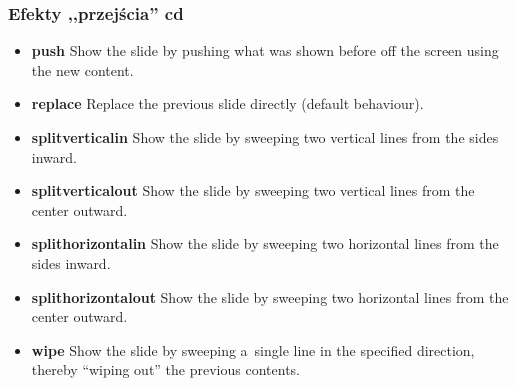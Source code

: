 \documentclass[12pt,aspectratio=169,ignorenonframetext]{beamer}
\begin{document}
\begin{frame}
 \frametitle<presentation>{Efekty ,,przejścia'' cd}
 \begin{itemize}
  \item<1>
        \textbf{push}
        Show the slide by pushing what was shown before off the screen using the new content.
  \item<2>
        \textbf{replace}
        Replace the previous slide directly (default behaviour).
  \item<3>
        \textbf{splitverticalin}
        Show the slide by sweeping two vertical lines from the sides inward.
  \item<4>
        \textbf{splitverticalout}
        Show the slide by sweeping two vertical lines from the center outward.
  \item<5>
        \textbf{splithorizontalin}
        Show the slide by sweeping two horizontal lines from the sides inward.
  \item<6>
        \textbf{splithorizontalout}
        Show the slide by sweeping two horizontal lines from the center outward.
  \item<7>
        \textbf{wipe}
        Show the slide by sweeping a~single line in the specified direction, thereby “wiping out” the previous contents.
 \end{itemize}
\end{frame}

\end{document}
